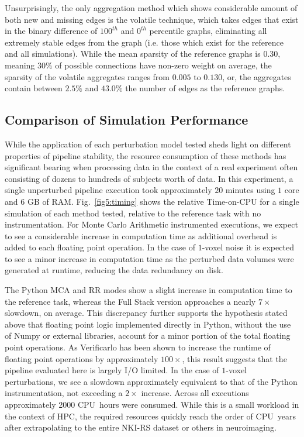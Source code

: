 \documentclass[fleqn,12pt]{SelfArx_ch} %
\begin{document}
Unsurprisingly, the only aggregation method which shows considerable amount of both new and missing edges is the
volatile technique, which takes edges that exist in the binary difference of $100^{th}$ and $0^{th}$ percentile graphs,
eliminating all extremely stable edges from the graph (i.e. those which exist for the reference and all simulations).
While the mean sparsity of the reference graphs is $0.30$, meaning $30 \%$ of possible connections have non-zero weight
on average, the sparsity of the volatile aggregates ranges from $0.005$ to $0.130$, or, the aggregates contain between
$2.5 \%$ and $43.0 \%$ the number of edges as the reference graphs. 

\subsection{Comparison of Simulation Performance}
While the application of each perturbation model tested sheds light on different properties of pipeline stability, the
resource consumption of these methods has significant bearing when processing data in the context of a real experiment
often consisting of dozens to hundreds of subjects worth of data. In this experiment, a single unperturbed pipeline
execution took approximately $20$ minutes using $1$ core and $6$ GB of RAM. Fig.~\ref{fig5:timing} shows the relative
Time-on-CPU for a single simulation of each method tested, relative to the reference task with no instrumentation. For
Monte Carlo Arithmetic instrumented executions, we expect to see a considerable increase in computation time as
additional overhead is added to each floating point operation. In the case of $1$-voxel noise it is expected to see a
minor increase in computation time as the perturbed data volumes were generated at runtime, reducing the data
redundancy on disk. 

The Python MCA and RR modes show a slight increase in computation time to the reference task, whereas the Full Stack
version approaches a nearly $7 \times$ slowdown, on average. This discrepancy further supports the hypothesis stated
above that floating point logic implemented directly in Python, without the use of Numpy or external libraries, account
for a minor portion of the total floating point operations. As Verificarlo has been shown to increase the runtime of
floating point operations by approximately $100 \times$, this result suggests that the pipeline evaluated here is
largely I/O limited. In the case of $1$-voxel perturbations, we see a slowdown approximately equivalent to that of the
Python instrumentation, not exceeding a $2 \times$ increase. Across all executions approximately 2000 CPU~hours were
consumed. While this is a small workload in the context of HPC, the required resources quickly reach the order of
CPU~years after extrapolating to the entire NKI-RS dataset or others in neuroimaging.
\end{document}
